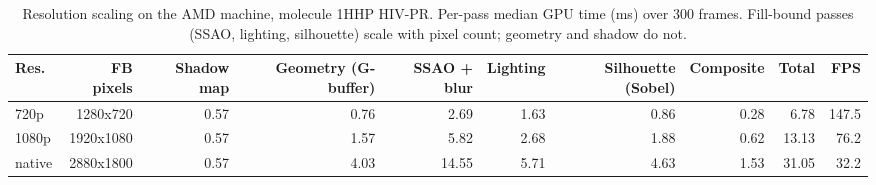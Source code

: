 \begin{table}[H]
    \centering
    \small
    \begin{tabular}{lrrrrrrrrr}
        \toprule
        Res. & FB pixels & Shadow map & Geometry (G-buffer) & SSAO + blur & Lighting & Silhouette (Sobel) & Composite & Total & FPS \\
        \midrule
        720p & 1280x720 & 0.57 & 0.76 & 2.69 & 1.63 & 0.86 & 0.28 & 6.78 & 147.5 \\
        1080p & 1920x1080 & 0.57 & 1.57 & 5.82 & 2.68 & 1.88 & 0.62 & 13.13 & 76.2 \\
        native & 2880x1800 & 0.57 & 4.03 & 14.55 & 5.71 & 4.63 & 1.53 & 31.05 & 32.2 \\
        \bottomrule
    \end{tabular}
    \caption{Resolution scaling on the AMD machine, molecule 1HHP HIV-PR. Per-pass median GPU time (ms) over 300 frames. Fill-bound passes (SSAO, lighting, silhouette) scale with pixel count; geometry and shadow do not.}
    \label{tab:resolution_amd}
\end{table}
